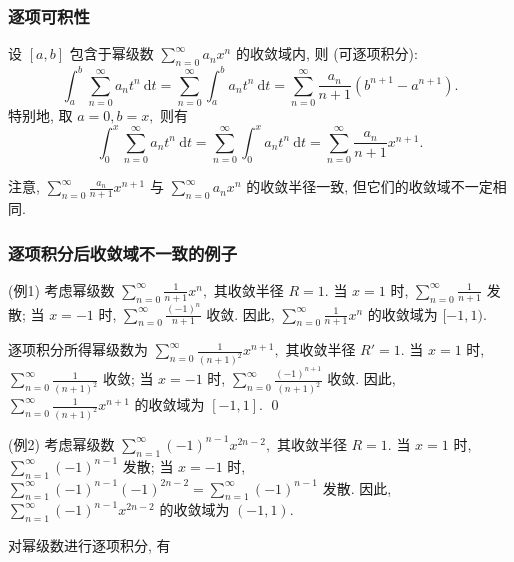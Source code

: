 
\begin{frame}
\frametitle{逐项可积性}

\begin{thm}[幂级数的逐项可积性]
设 $[a, b]$ 包含于幂级数 $\displaystyle \sum_{n=0}^{\infty} a_n x^n$ 的收敛域内, 则 (可逐项积分):
\[
\int_{a}^{b} \sum_{n=0}^{\infty} a_n t^n ~ \mathrm{d}t = \sum_{n=0}^{\infty} \int_{a}^{b} a_n t^n ~ \mathrm{d}t = \sum_{n=0}^{\infty} \frac{a_n}{n+1} (b^{n+1} - a^{n+1}).
\]
特别地, 取 $a = 0, b = x,$ 则有
\[
\int_{0}^{x} \sum_{n=0}^{\infty} a_n t^n ~ \mathrm{d}t = \sum_{n=0}^{\infty} \int_{0}^{x} a_n t^n ~ \mathrm{d}t = \sum_{n=0}^{\infty} \frac{a_n}{n+1} x^{n+1}.
\]
\end{thm}

\pause

\begin{remark}
注意, $\sum_{n=0}^{\infty} \frac{a_n}{n+1} x^{n+1}$ 与 $\sum_{n=0}^{\infty} a_n x^n$ 的收敛半径一致, \alert{但它们的收敛域不一定相同.}
\end{remark}

\end{frame}


\begin{frame}
\frametitle{逐项积分后收敛域不一致的例子}

\startproof[bg=yellow, fg=red](例1)
考虑幂级数 $\displaystyle \sum_{n=0}^{\infty} \frac{1}{n+1} x^n,$ 其收敛半径 $R = 1.$ 当 $x = 1$ 时, $\displaystyle \sum_{n=0}^{\infty} \frac{1}{n+1}$ 发散; 当 $x = -1$ 时, $\displaystyle \sum_{n=0}^{\infty} \frac{(-1)^n}{n+1}$ 收敛. 因此, $\displaystyle \sum_{n=0}^{\infty} \frac{1}{n+1} x^n$ 的收敛域为 $[-1, 1).$

\pause

逐项积分所得幂级数为 $\displaystyle \sum_{n=0}^{\infty} \frac{1}{(n+1)^2} x^{n+1},$ 其收敛半径 $R' = 1.$ 当 $x = 1$ 时, $\displaystyle \sum_{n=0}^{\infty} \frac{1}{(n+1)^2}$ 收敛; 当 $x = -1$ 时, $\displaystyle \sum_{n=0}^{\infty} \frac{(-1)^{n+1}}{(n+1)^2}$ 收敛. 因此, $\displaystyle \sum_{n=0}^{\infty} \frac{1}{(n+1)^2} x^{n+1}$ 的收敛域为 $[-1, 1].$
\qed

\pause
\vspace{1em}

\startproof[bg=yellow, fg=red](例2)
考虑幂级数 $\displaystyle \sum_{n=1}^{\infty} (-1)^{n-1} x^{2n-2},$ 其收敛半径 $R = 1.$ 当 $x = 1$ 时, $\displaystyle \sum_{n=1}^{\infty} (-1)^{n-1}$ 发散; 当 $x = -1$ 时, $\displaystyle \sum_{n=1}^{\infty} (-1)^{n-1} (-1)^{2n-2} = \displaystyle \sum_{n=1}^{\infty} (-1)^{n-1}$ 发散. 因此, $\displaystyle \sum_{n=1}^{\infty} (-1)^{n-1} x^{2n-2}$ 的收敛域为 $(-1, 1).$

对幂级数进行逐项积分, 有

\end{frame}

